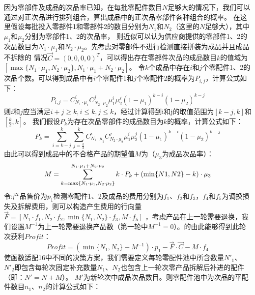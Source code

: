 \documentclass[withoutpreface,bwprint]{cumcmthesis} %
\begin{document}
因为零部件及成品的次品率已知，在每批零配件数目$N$足够大的情况下，我们可以通过对正次品进行排列组合，算出成品中的正次品零部件各种组合的概率。
在这里假设每批投入零部件1和零部件2的数目分别为$N_{1}$和$N_{2}$（这里的$N$足够大），其中$\mu_{1}$和$\mu_{2}$分别为零部件1、2的次品率，
则近似可以认为供应商提供的零部件1、2的次品数目为$N_{1}\cdot\mu_{1}$和$N_{2}\cdot\mu_{2}$。先考虑对零部件不进行检测直接拼装为成品并且成品不拆除的
情况$\vec{C}=(0,0,0,0)^{T}$，可以得出存在零部件次品的成品数目$k$的值域为$[\max \{N_{1}\cdot\mu_{1},N_{2}\cdot\mu_{2} \},N_{1}\cdot\mu_{1}+N_{2}\cdot\mu_{2}]$。
令$k$个成品中存在$i$和$j$个零配件1、2的次品个数。可以得到成品中有$i$个零配件1和$j$个零配件2的概率为$P_{i,j}$，计算公式如下：
\begin{equation}
	P_{i,j}=C_{N_{1}\cdot\mu_{1}}^{i}C_{N_{2}\cdot\mu_{2}}^{j}\mu_{1}^{i}\mu_{2}^{j}(1-\mu_{1})^{k-i}(1-\mu_{2})^{k-j}
	\label{eq:1}
\end{equation}
则$i$和$j$应当满足$i+j\ge k,i\le k,j\le k$，经过计算得到i和j的取值范围为$[k-j,k]$和$[\frac{k}{2},k]$。
我们假设$P_{k}$为存在次品零部件的成品数目为$k$的概率，计算公式如下：
\begin{equation}
	P_{k}=\sum_{i=k-j}^{k}\sum_{j=\frac{k}{2}}^{k}C_{N_{1}\cdot\mu_{1}}^{i}C_{N_{2}\cdot\mu_{2}}^{j}\mu_{1}^{i}\mu_{2}^{j}(1-\mu_{1})^{k-i}(1-\mu_{2})^{k-j}
	\label{eq:2}
\end{equation}
由此可以得到成品中的不合格产品的期望值$M$为（$\mu_{3}$为成品次品率）：
\begin{equation}
	M=\sum_{k=\max \{N_{1}\cdot\mu_{1},N_{2}\cdot\mu_{2} \}}^{N_{1}\cdot\mu_{1}+N_{2}\cdot\mu_{2}}k\cdot P_{k} + (\min \{ N1,N2\}-k)\cdot \mu_{3}\\
	\label{eq:3}
\end{equation}
令:产品售价为$p_{1}$检测零配件1、2及成品的费用分别为$f_{1}$、$f_{2}$和$f_{3}$，$f_{4}$和$f_{5}$为调换损失及拆解费用，则可以构造产生费用的行向量$\vec{F}=[N_{1}\cdot f_{1},N_{2}\cdot f_{2},\min \{N_{1},N_{2}\}\cdot f_{3},M\cdot f_{5}]$
，考虑产品在上一轮需要退换，我们设置$M^{-1}$为上一轮需要退换产品数（第一轮中$M^{-1}=0$）。的由此能够得到此轮次获利$Profit$：
\begin{equation}
	\textit{Profit}=(\min \{N_{1},N_{2}\}-M^{-1})\cdot p_{1}-\vec{F}\cdot \vec{C}-M\cdot f_{4}
	\label{eq:4}
\end{equation}
使函数适配16中不同的决策方案，我们需要定义每轮零配件池中所含数量$N'_{1}$、$N'_{2}$即包含每轮次固定补充数量$N_{1}$、$N_{2}$也包含上一轮次零产品拆解后补进的配件（即：$N'=N+M$）。
$M'$为新轮次中成品次品数目。则零配件池中为次品的平配件数目$n_{1}$、$n_{2}$的计算公式如下：
\end{document}
